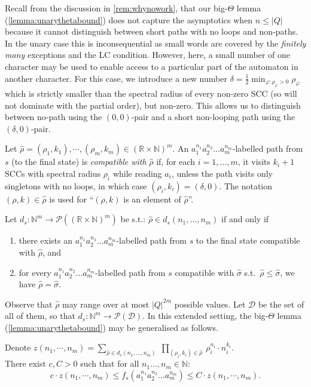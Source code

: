 \documentclass{lmcs}
\theoremstyle{plain}
\theoremstyle{definition}
\theoremstyle{remark}
\newcommand\z[1]{z(#1)}
\newcommand\dgf{d}
\newcommand{\scc}{\varphi}
\renewcommand\nu{f}
\begin{document}
Recall from the discussion in \cref{rem:whynowork}, that our big-$\Theta$ lemma (\cref{lemma:unarythetabound}) does not capture the asymptotics when $n \le |Q|$ because it cannot distinguish between short paths with no loops and non-paths. In the unary case this is inconsequential as small words are covered by the \textit{finitely many} exceptions and the LC condition. However, here, a small number of one character may be used to enable access to a particular part of the automaton in another character. For this case, we introduce a new number $\delta= \frac{1}{2}\min_{\scc{} : \rho_\scc{} > 0} \rho_\scc{}$ which is strictly smaller than the spectral radius of every non-zero SCC (so will not dominate with the partial order), but non-zero. This allows us to distinguish between no-path using the $(0,0)$-pair and a short non-looping path using the $(\delta,0)$-pair.

\begin{defi}
\label{def:boundedcompat}
Let $\hat{\rho}= (\rho_1,k_1), \cdots, (\rho_m,k_m)\in (\mathbb{R} \times \mathbb{N})^m$.
An $a_1^{n_1}a_2^{n_2}\dots a_m^{n_m}$-labelled path from $s$ (to the final state) is \emph{compatible with} $\hat{\rho}$
if, for each $i = 1,\dots, m$, it visits $k_i + 1$ SCCs with spectral radius $\rho_i$ while reading $a_i$, unless the path visits only singletons with no loops, in which case $(\rho_i,k_i) = (\delta,0)$. The notation $(\rho,k)\in \hat{\rho}$ is used for ``$(\rho,k)$ is an element of  $\hat{\rho}$''.
\end{defi}
\begin{defi}
\label{def:boundeddegree}
Let $\dgf_{s} : \mathbb{N}^m \to \mathcal{P}((\mathbb{R} \times \mathbb{N})^m)$ be s.t.:
$\hat{\rho}\in \dgf_s(n_1,\dots,n_m) $ if and only if
\begin{enumerate}[(1)]
\item there exists an  $a_1^{n_1}a_2^{n_2}\dots a_m^{n_m}$-labelled path from $s$ to the final state compatible with $\hat{\rho}$, and
\item for every $a_1^{n_1}a_2^{n_2}\dots a_m^{n_m}$-labelled path from $s$ compatible with $\hat{\sigma}$ s.t.\ $\hat{\rho}\le\hat{\sigma}$, we have $\hat{\rho}=\hat{\sigma}$.
\end{enumerate}
\end{defi}

\noindent Observe that $\hat{\rho}$ may range over at most $|Q|^{2m}$ possible values. Let $\mathcal{D}$ be the set of all of them, so that $\dgf_{s}: \mathbb{N}^m \to \mathcal{P}(\mathcal{D})$.
In this extended setting, the big-$\Theta$ lemma (\cref{lemma:unarythetabound}) may be generalised as follows.
\begin{lem} \label{lemma:thetaletterbounded}
Denote $\z{n_1,\cdots,n_m} =  \sum_{\hat{\rho}\in \dgf_s(n_1,\dots,n_m)}\; \prod_{(\rho_i,k_i) \in \hat{\rho}} \ \rho_i^{n_i} \cdot n_i^{k_i}.$\\
There exist $c,C > 0$ such that for all $n_1\dots,n_m\in \mathbb{N}$:
\[
c\cdot \z{n_1,\cdots,n_m} \le  \nu_s(a_1^{n_1}a_2^{n_2}\dots a_m^{n_m}) \le C\cdot \z{n_1,\cdots,n_m}.
\]
\end{lem}
\end{document}
